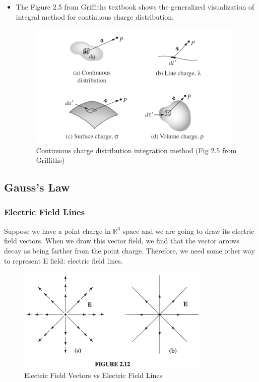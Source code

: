 \documentclass[12pt,a4paper,twoside]{article}
\numberwithin{equation}{section}
\begin{document}
\begin{itemize}
    \item The Figure 2.5 from Griffiths textbook shows the generalized visualization of integral method for continuous charge distribution.
    \begin{figure}[h]
        \centering
        \includegraphics[height=6cm]{250-Revision/continuous-charge.png}
        \caption{Continuous charge distribution integration method (Fig 2.5 from Griffiths)}
        \label{fig:continuous-charge}
    \end{figure}
\end{itemize}

\subsection{Gauss's Law}
\subsubsection{Electric Field Lines}
    Suppose we have a point charge in $\mathbb{R}^3$ space and we are going to draw its electric field vectors. When we draw this vector field, we find that the vector arrows decay as being farther from the point charge.  Therefore, we need some other way to represent E field: electric field lines.
    \begin{figure}[ht]
        \centering
        \includegraphics[height = 5cm]{250-Revision/Fig-2-12.png}
        \caption{Electric Field Vectors vs Electric Field Lines}
        \label{fig:field-lines}
    \end{figure}
    
\end{document}
